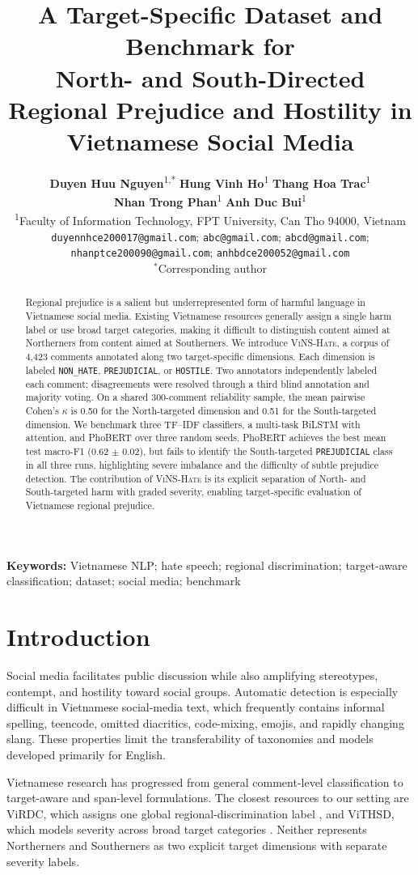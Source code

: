 \documentclass[11pt]{article}
\title{A Target-Specific Dataset and Benchmark for\\
North- and South-Directed Regional Prejudice and Hostility in Vietnamese Social Media}
\author{
  \textbf{Duyen Huu Nguyen}\textsuperscript{1,*} \quad
  \textbf{Hung Vinh Ho}\textsuperscript{1} \quad
  \textbf{Thang Hoa Trac}\textsuperscript{1}\\
  \textbf{Nhan Trong Phan}\textsuperscript{1} \quad
  \textbf{Anh Duc Bui}\textsuperscript{1}\\[0.5em]
  \small \textsuperscript{1}Faculty of Information Technology, FPT University, Can Tho 94000, Vietnam\\
  \small \texttt{duyennhce200017@gmail.com}; \texttt{abc@gmail.com}; \texttt{abcd@gmail.com};\\
  \small \texttt{nhanptce200090@gmail.com}; \texttt{anhbdce200052@gmail.com}\\[-0.1em]
  \small $^{*}$Corresponding author
}
\date{}
\newcommand{\dataset}{\textsc{ViNS-Hate}}
\begin{document}
\maketitle

\begin{abstract}
Regional prejudice is a salient but underrepresented form of harmful language in Vietnamese social media. Existing Vietnamese resources generally assign a single harm label or use broad target categories, making it difficult to distinguish content aimed at Northerners from content aimed at Southerners. We introduce \dataset, a corpus of 4,423 comments annotated along two target-specific dimensions. Each dimension is labeled \texttt{NON\_HATE}, \texttt{PREJUDICIAL}, or \texttt{HOSTILE}. Two annotators independently labeled each comment; disagreements were resolved through a third blind annotation and majority voting. On a shared 300-comment reliability sample, the mean pairwise Cohen's $\kappa$ is 0.50 for the North-targeted dimension and 0.51 for the South-targeted dimension. We benchmark three TF--IDF classifiers, a multi-task BiLSTM with attention, and PhoBERT over three random seeds. PhoBERT achieves the best mean test macro-F1 (0.62 $\pm$ 0.02), but fails to identify the South-targeted \texttt{PREJUDICIAL} class in all three runs, highlighting severe imbalance and the difficulty of subtle prejudice detection. The contribution of \dataset{} is its explicit separation of North- and South-targeted harm with graded severity, enabling target-specific evaluation of Vietnamese regional prejudice.
\end{abstract}

\noindent\textbf{Keywords:} Vietnamese NLP; hate speech; regional discrimination; target-aware classification; dataset; social media; benchmark

\section{Introduction}

Social media facilitates public discussion while also amplifying stereotypes, contempt, and hostility toward social groups. Automatic detection is especially difficult in Vietnamese social-media text, which frequently contains informal spelling, teencode, omitted diacritics, code-mixing, emojis, and rapidly changing slang. These properties limit the transferability of taxonomies and models developed primarily for English.

Vietnamese research has progressed from general comment-level classification to target-aware and span-level formulations. The closest resources to our setting are ViRDC, which assigns one global regional-discrimination label \cite{huynh2024virdc}, and ViTHSD, which models severity across broad target categories \cite{vo2025vithsd}. Neither represents Northerners and Southerners as two explicit target dimensions with separate severity labels.
\end{document}
